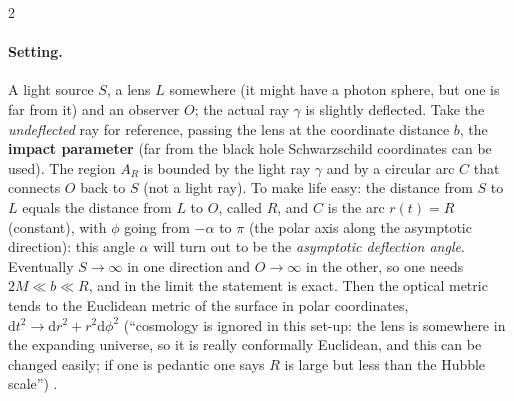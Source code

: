\begin{paracol}{2}
\paragraph{Setting.} A light source $S$, a lens $L$ somewhere (it might have a photon sphere, but one is far from it) and an observer $O$; the actual ray $\gamma$ is slightly deflected. Take the \emph{undeflected} ray for reference, passing the lens at the coordinate distance $b$, the \textbf{impact parameter} (far from the black hole Schwarzschild coordinates can be used). The region $A_R$ is bounded by the light ray $\gamma$ and by a circular arc $C$ that connects $O$ back to $S$ (not a light ray). To make life easy: the distance from $S$ to $L$ equals the distance from $L$ to $O$, called $R$, and $C$ is the arc $r(t)=R$ (constant), with $\phi$ going from $-\alpha$ to $\pi$ (the polar axis along the asymptotic direction): this angle $\alpha$ will turn out to be the \emph{asymptotic deflection angle}. Eventually $S\to\infty$ in one direction and $O\to\infty$ in the other, so one needs $2M\ll b\ll R$, and in the limit the statement is exact. Then the optical metric tends to the Euclidean metric of the surface in polar coordinates, $\mathrm dt^2\to\mathrm dr^2+r^2\mathrm d\phi^2$ (``cosmology is ignored in this set-up: the lens is somewhere in the expanding universe, so it is really conformally Euclidean, and this can be changed easily; if one is pedantic one says $R$ is large but less than the Hubble scale'') .


\end{paracol}
